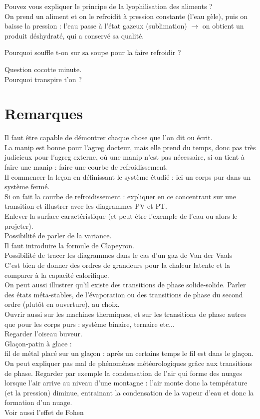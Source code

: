 \documentclass[12pt,prb,aps,epsf]{report}
\begin{document}
Pouvez vous expliquer le principe de la lyophilisation des aliments ?\\
On prend un aliment et on le refroidit à pression constante (l'eau gèle), puis on baisse la pression : l'eau passe à l'état gazeux (sublimation) $\rightarrow$ on obtient un produit déshydraté, qui a conservé sa qualité.

Pourquoi souffle t-on sur sa soupe pour la faire refroidir ?

Question cocotte minute.\\

Pourquoi transpire t'on ?\\

\section*{Remarques}
Il faut être capable de démontrer chaque chose que l'on dit ou écrit.\\
La manip est bonne pour l'agreg docteur, mais elle prend du temps, donc pas très judicieux pour l'agreg externe, où une manip n'est pas nécessaire, si on tient à faire une manip : faire une courbe de refroidissement.\\
Il commencer la leçon en définissant le système étudié : ici un corps pur dans un système fermé.\\
Si on fait la courbe de refroidissement : expliquer en ce concentrant sur une transition et illustrer avec les diagrammes PV et PT.\\
Enlever la surface caractéristique (et peut être l'exemple de l'eau ou alors le projeter).\\
Possibilité de parler de la variance.\\
Il faut introduire la formule de Clapeyron.\\
Possibilité de tracer les diagrammes dans le cas d'un gaz de Van der Vaals\\
C'est bien de donner des ordres de grandeurs pour la chaleur latente et la comparer à la capacité calorifique.\\
On peut aussi illustrer qu'il existe des transitions de phase solide-solide.
Parler des états méta-stables, de l'évaporation ou des transitions de phase du second ordre (plutôt en ouverture), au choix.\\
Ouvrir aussi sur les machines thermiques, et sur les transitions de phase autres que pour les corps purs : système binaire, ternaire etc...\\

Regarder l'oiseau buveur.\\

Glaçon-patin à glace :\\
fil de métal placé sur un glaçon : après un certains temps le fil est dans le glaçon.\\

On peut expliquer pas mal de phénomènes météorologiques grâce aux transitions de phase. Regarder par exemple la condensation de l'air qui forme des nuages lorsque l'air arrive au niveau d'une montagne : l'air monte donc la température (et la pression) diminue, entrainant la condensation de la vapeur d'eau et donc la formation d'un nuage.\\
Voir aussi l'effet de Fohen
\end{document}
